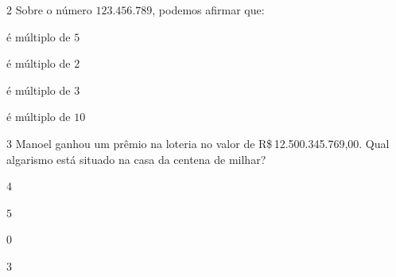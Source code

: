 \num{2} Sobre o número $123.456.789$, podemos afirmar que:

\begin{escolha}
\item é múltiplo de $5$
\item é múltiplo de $2$
\item é múltiplo de $3$
\item é múltiplo de $10$
\end{escolha}








\num{3} Manoel ganhou um prêmio na loteria no valor de R\$\,12.500.345.769,00.
Qual algarismo está situado na casa da centena de milhar?

\begin{escolha}
\item $4$
\item $5$
\item $0$
\item $3$
\end{escolha}






